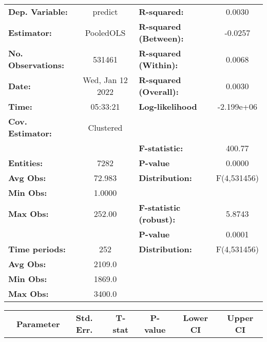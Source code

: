 \begin{center}
\begin{tabular}{lclc}
\toprule
\textbf{Dep. Variable:}    &      predict       & \textbf{  R-squared:         }   &      0.0030      \\
\textbf{Estimator:}        &     PooledOLS      & \textbf{  R-squared (Between):}  &     -0.0257      \\
\textbf{No. Observations:} &       531461       & \textbf{  R-squared (Within):}   &      0.0068      \\
\textbf{Date:}             &  Wed, Jan 12 2022  & \textbf{  R-squared (Overall):}  &      0.0030      \\
\textbf{Time:}             &      05:33:21      & \textbf{  Log-likelihood     }   &    -2.199e+06    \\
\textbf{Cov. Estimator:}   &     Clustered      & \textbf{                     }   &                  \\
\textbf{}                  &                    & \textbf{  F-statistic:       }   &      400.77      \\
\textbf{Entities:}         &        7282        & \textbf{  P-value            }   &      0.0000      \\
\textbf{Avg Obs:}          &       72.983       & \textbf{  Distribution:      }   &   F(4,531456)    \\
\textbf{Min Obs:}          &       1.0000       & \textbf{                     }   &                  \\
\textbf{Max Obs:}          &       252.00       & \textbf{  F-statistic (robust):} &      5.8743      \\
\textbf{}                  &                    & \textbf{  P-value            }   &      0.0001      \\
\textbf{Time periods:}     &        252         & \textbf{  Distribution:      }   &   F(4,531456)    \\
\textbf{Avg Obs:}          &       2109.0       & \textbf{                     }   &                  \\
\textbf{Min Obs:}          &       1869.0       & \textbf{                     }   &                  \\
\textbf{Max Obs:}          &       3400.0       & \textbf{                     }   &                  \\
\bottomrule
\end{tabular}
\begin{tabular}{lcccccc}
                & \textbf{Parameter} & \textbf{Std. Err.} & \textbf{T-stat} & \textbf{P-value} & \textbf{Lower CI} & \textbf{Upper CI}  \\

\end{tabular}
\end{center}
